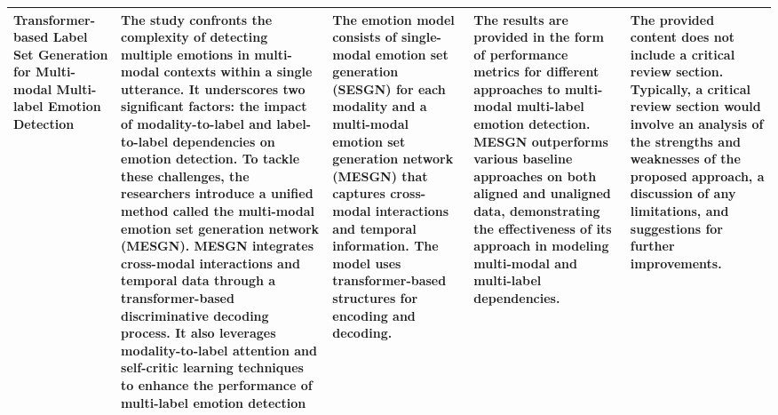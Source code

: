 \documentclass[conference]{IEEEtran}
\begin{document}
\begin{longtable}
\begin{tabularx}{\textwidth}{|>{\raggedright\arraybackslash}X|>{\raggedright\arraybackslash}X|>{\raggedright\arraybackslash}X|>{\raggedright\arraybackslash}X|>{\raggedright\arraybackslash}X|}
\hline
Transformer-based Label Set Generation for Multi-modal Multi-label Emotion Detection &The study confronts the complexity of detecting multiple emotions in multi-modal contexts within a single utterance. It underscores two significant factors: the impact of modality-to-label and label-to-label dependencies on emotion detection. To tackle these challenges, the researchers introduce a unified method called the multi-modal emotion set generation network (MESGN). MESGN integrates cross-modal interactions and temporal data through a transformer-based discriminative decoding process. It also leverages modality-to-label attention and self-critic learning techniques to enhance the performance of multi-label emotion detection& The emotion model consists of single-modal emotion set generation (SESGN) for each modality and a multi-modal emotion set generation network (MESGN) that captures cross-modal interactions and temporal information. The model uses transformer-based structures for encoding and decoding. &The results are provided in the form of performance metrics for different approaches to multi-modal multi-label emotion detection. MESGN outperforms various baseline approaches on both aligned and unaligned data, demonstrating the effectiveness of its approach in modeling multi-modal and multi-label dependencies. &The provided content does not include a critical review section. Typically, a critical review section would involve an analysis of the strengths and weaknesses of the proposed approach, a discussion of any limitations, and suggestions for further improvements. \\
\hline

\end{tabularx}
\end{longtable}
\end{document}

